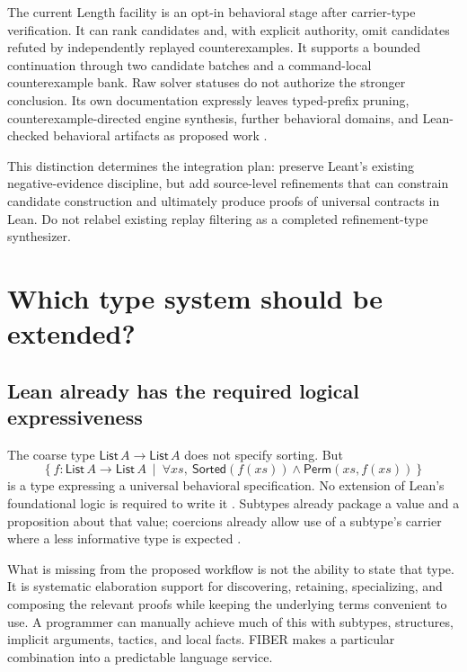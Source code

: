 \documentclass[11pt,letterpaper]{article}
\theoremstyle{definition}\newtheorem{definition}[theorem]{Definition}
\begin{document}
The current Length facility is an opt-in behavioral stage after carrier-type verification. It can rank candidates and, with explicit authority, omit candidates refuted by independently replayed counterexamples. It supports a bounded continuation through two candidate batches and a command-local counterexample bank. Raw solver statuses do not authorize the stronger conclusion. Its own documentation expressly leaves typed-prefix pruning, counterexample-directed engine synthesis, further behavioral domains, and Lean-checked behavioral artifacts as proposed work \cite{leantLength}.

This distinction determines the integration plan: preserve Leant's existing negative-evidence discipline, but add source-level refinements that can constrain candidate construction and ultimately produce proofs of universal contracts in Lean. Do not relabel existing replay filtering as a completed refinement-type synthesizer.

\section{Which type system should be extended?}\label{sec:extension}
\subsection{Lean already has the required logical expressiveness}
The coarse type $\mathsf{List}\,A\to\mathsf{List}\,A$ does not specify sorting. But
\[
 \left\{f:\mathsf{List}\,A\to\mathsf{List}\,A\ \middle|\
  \forall xs,\ \mathsf{Sorted}(f(xs))\land\mathsf{Perm}(xs,f(xs))\right\}
\]
is a type expressing a universal behavioral specification. No extension of Lean's foundational logic is required to write it \cite{leanTypes}. Subtypes already package a value and a proposition about that value; coercions already allow use of a subtype's carrier where a less informative type is expected \cite{leanSubtype,leanCoercions}.

What is missing from the proposed workflow is not the ability to state that type. It is systematic elaboration support for discovering, retaining, specializing, and composing the relevant proofs while keeping the underlying terms convenient to use. A programmer can manually achieve much of this with subtypes, structures, implicit arguments, tactics, and local facts. FIBER makes a particular combination into a predictable language service.
\end{document}

